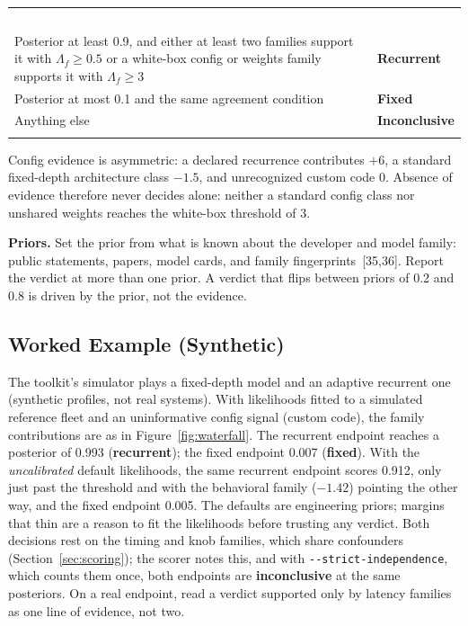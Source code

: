 \documentclass[11pt,letterpaper]{article}
\newcommand{\hd}[1]{\textcolor{white}{\bfseries #1}}
\newcommand{\tablefinish}{\arrayrulecolor{deepindigo}\specialrule{0.8pt}{0pt}{0pt}\arrayrulecolor{black}}
\newcommand{\zebra}{\rowcolors{2}{white}{paleindigo!75}}
\newcommand{\cfg}[1]{\texttt{\small #1}}
\begin{document}
{\small
\zebra
\begin{tabularx}{\textwidth}{Y L{3.0cm}}
\hd{Condition} & \hd{Verdict} \\
Posterior at least 0.9, and either at least two families support it with $\Lambda_f \geq 0.5$ or a white-box config or weights family supports it with $\Lambda_f \geq 3$ & \textbf{Recurrent} \\
Posterior at most 0.1 and the same agreement condition & \textbf{Fixed} \\
Anything else & \textbf{Inconclusive} \\
\tablefinish
\end{tabularx}\par}

Config evidence is asymmetric: a declared recurrence contributes $+6$, a standard fixed-depth architecture class $-1.5$, and unrecognized custom code $0$. Absence of evidence therefore never decides alone: neither a standard config class nor unshared weights reaches the white-box threshold of 3.

\textbf{Priors.} Set the prior from what is known about the developer and model family: public statements, papers, model cards, and family fingerprints~[35,36]. Report the verdict at more than one prior. A verdict that flips between priors of 0.2 and 0.8 is driven by the prior, not the evidence.

\subsection{Worked Example (Synthetic)}
\label{sec:worked}

The toolkit's simulator plays a fixed-depth model and an adaptive recurrent one (synthetic profiles, not real systems). With likelihoods fitted to a simulated reference fleet and an uninformative config signal (custom code), the family contributions are as in Figure~\ref{fig:waterfall}. The recurrent endpoint reaches a posterior of 0.993 (\textbf{recurrent}); the fixed endpoint 0.007 (\textbf{fixed}). With the \emph{uncalibrated} default likelihoods, the same recurrent endpoint scores 0.912, only just past the threshold and with the behavioral family ($-1.42$) pointing the other way, and the fixed endpoint 0.005. The defaults are engineering priors; margins that thin are a reason to fit the likelihoods before trusting any verdict. Both decisions rest on the timing and knob families, which share confounders (Section~\ref{sec:scoring}); the scorer notes this, and with \cfg{-{}-strict-independence}, which counts them once, both endpoints are \textbf{inconclusive} at the same posteriors. On a real endpoint, read a verdict supported only by latency families as one line of evidence, not two.
\end{document}
